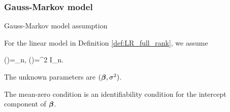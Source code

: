 \documentclass[10pt,a4paper]{book}
\begin{document}
\subsubsection{Gauss-Markov model}
\begin{assbox}{Gauss-Markov model assumption}
	\begin{assumption}\label{ass:GM_ass}
		For the linear model in Definition \ref{def:LR_full_rank}, we assume 
		\begin{sequation}\label{eq:GM_ass_diag}
			\bbE(\bave)=\0_n, \qquad \Cov(\bave)=\sigma^2 I_n. 
		\end{sequation}
		The unknown parameters are $({\boldsymbol\beta},\sigma^2)$. 
	\end{assumption}
\end{assbox}
The mean-zero condition is an identifiability condition for the intercept component of ${\boldsymbol\beta}$. 
\end{document}
